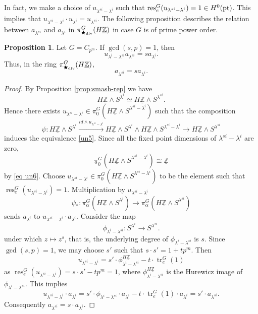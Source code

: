 \documentclass[a4paper,leqno,11pt]{amsart}
\theoremstyle{plain}
\theoremstyle{definition}
\newtheorem{prop}[theorem]{Proposition}
\theoremstyle{remark}
\theoremstyle{definition}
\newcommand{\upi}{\underline{\pi}}
\newcommand\tr{\operatorname{tr}}
\newenvironment{myeq}[1][]
{\stepcounter{theorem}\begin{equation}\tag{\thetheorem}{#1}}
	{\end{equation}}
\newcommand{\res}{\mathit{res}}
\newcommand{\uZ}{\underline{\mathbb{Z}}}
\numberwithin{equation}{section}
\newcommand{\smas}{\wedge}
\newcommand{\pt}{\textup{pt}}
\renewcommand{\res}{\operatorname{res}}
\begin{document}
	In fact, we make  a choice of $ u_{\lambda^{si}-\lambda^i} $ such that $ \res_e^G(u_{\lambda^{si}-\lambda^i})=1\in H^0(\pt) $. This implies that $ u_{\lambda^{si}-\lambda^i}\cdot u_{\lambda^i}=u_{\lambda^{si}} $. The following proposition describes the relation between $  a_{\lambda^{si}} $ and $ a_{\lambda^{i}}  $ in $ \pi^G_{\bigstar_{\textup{div}}}(H\uZ) $ in case $ G $ is of prime power order.
	\begin{prop}\label{prop:un5}
	Let $ G=C_{p^m} $.	 If $ \gcd(s,p)=1 $, then 
	\[
	 u_{\lambda^{i}-\lambda^{si}}a_{\lambda^{si}}= sa_{\lambda^i}.
	\]
	Thus, in the ring $ \pi^G_{\bigstar_{\textup{div}}}(H\uZ) $,
		 \[
		 a_{\lambda^{si}}= sa_{\lambda^i}.
		 \]
	\end{prop} 
\begin{proof}
	By	Proposition \ref{prop:smash-rep} we have 
\begin{myeq}\label{un5}
	H\uZ\smas S^{\lambda^i} \simeq H\uZ\smas S^{\lambda^{s i}}.
\end{myeq}
	Hence there exists $ u_{\lambda^{si}-\lambda^i}\in \pi_0^G(H\uZ\smas S^{\lambda^{si}-\lambda^i}) $ such that the  composition
\[
\psi: H\uZ\smas S^{\lambda^i}\xrightarrow{id\smas u_{\lambda^{si}-\lambda^i}} H\uZ\smas S^{\lambda^i}\smas H\uZ\smas S^{\lambda^{si}-\lambda^i}\to H\uZ\smas S^{\lambda^{si}}
\]	
induces the equivalence \eqref{un5}. Since all the fixed point dimensions of $ \lambda^{si}-\lambda^i $ are zero,
\[
\upi_0^G(H\uZ\smas S^{\lambda^{si}-\lambda^i})\cong \uZ
\]
by \eqref{eq un6}. Choose $ u_{\lambda^{si}-\lambda^i}\in \pi_0^G(H\uZ\smas S^{\lambda^{si}-\lambda^i}) $ to be the element such that $ \res^G_e(u_{\lambda^{si}-\lambda^i})=1 $.
Multiplication by $u_{\lambda^{si}-\lambda^i}$
\[
\psi_*: \pi_\alpha^G(H\uZ\smas S^{\lambda^i}) \to \pi_\alpha^G(H\uZ\smas S^{\lambda^{si}}) 
\]
sends $ a_{\lambda^i} $ to $ u_{\lambda^{si}-\lambda^i}\cdot a_{\lambda^{i}} $. 
Consider the map
\[
\phi_{\lambda^{i}-\lambda^{si}}: S^{\lambda^i}\to S^{\lambda^{si}}.
\]
under which $ z \mapsto z^s$, that is, the underlying degree of $ \phi_{\lambda^{i}-\lambda^{si}} $ is $ s $. Since $  \gcd(s,p)=1  $, we may choose $ s' $ such that $ s\cdot s'=1+tp^m $. Then 
$$ u_{\lambda^{si}-\lambda^i}= s'\cdot \phi^{H\uZ}_{\lambda^{i}-\lambda^{si}}-t\cdot \tr_e^G(1)
$$
as $ \res^G_e(u_{\lambda^{si}-\lambda^i})=s\cdot s'-tp^m=1 $, where $ \phi^{H\uZ}_{\lambda^{i}-\lambda^{si}} $ is the Hurewicz image of $ \phi_{\lambda^{i}-\lambda^{si}} $.  This implies
 \[
 u_{\lambda^{si}-\lambda^i}\cdot a_{\lambda^i}=s'\cdot \phi_{\lambda^{i}-\lambda^{si}}\cdot a_{\lambda^i} -t\cdot \tr_e^G(1)\cdot a_{\lambda^i}= s'\cdot a_{\lambda^{si}}.
 \]
 Consequently $ a_{\lambda^{si}}=s\cdot a_{\lambda^i} $.
\end{proof}
\end{document}

